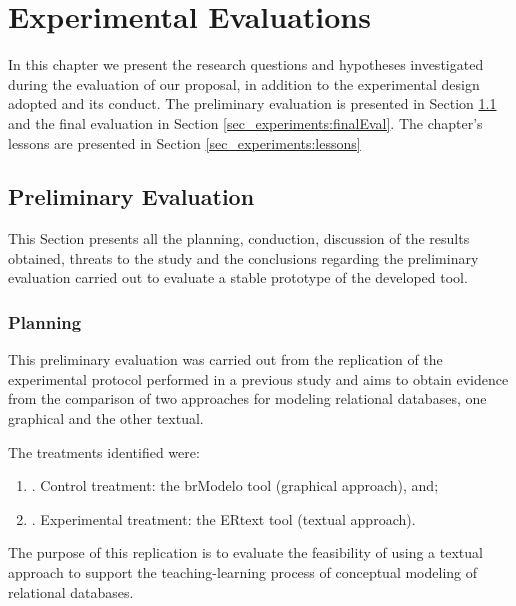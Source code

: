 \chapter{Experimental Evaluations}\label{chap:experiments}

In this chapter we present the research questions and hypotheses investigated during the evaluation of our proposal, in addition to the experimental design adopted and its conduct.
The preliminary evaluation is presented in Section \ref{sec_experiments:preliminaryEval} and the final evaluation in Section \ref{sec_experiments:finalEval}.
The chapter's lessons are presented in Section \ref{sec_experiments:lessons}

\section{Preliminary Evaluation} 
\label{sec_experiments:preliminaryEval}

This Section presents all the planning, conduction, discussion of the results obtained, threats to the study and the conclusions regarding the preliminary evaluation carried out to evaluate a stable prototype of the developed tool.

\subsection{Planning}
\label{ssec_experiments:preliminary_planning}

This preliminary evaluation was carried out from the replication of the experimental protocol performed in a previous study \cite{Lopes:2019} and aims to obtain evidence from the comparison of two approaches for modeling relational databases, one graphical and the other textual.

The treatments identified were:
\begin{enumerate} [label=\roman*]
    \item. Control treatment: the brModelo tool (graphical approach), and;
    \item. Experimental treatment: the ERtext tool (textual approach).
\end{enumerate}
The purpose of this replication is to evaluate the feasibility of using a textual approach to support the teaching-learning process of conceptual modeling of relational databases.

